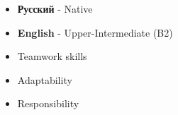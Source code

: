 
\twocolumnsection
{
\vspace{1em}
\begin{itemize}
   \item{} {\textbf{Русский}} - Native
   \item{} {\textbf{English}} - Upper-Intermediate (B2)
\end{itemize}}
{
\vspace{1em}
\begin{itemize}
   \item Teamwork skills
   \item Adaptability
   \item Responsibility
\end{itemize}}
